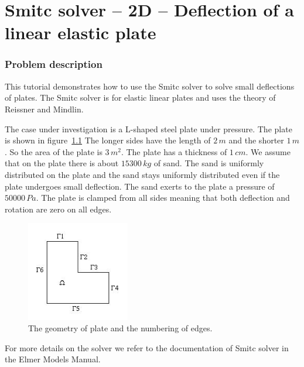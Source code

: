 \chapter{Smitc solver -- 2D -- Deflection of a linear elastic plate}



\subsection*{Problem description}

This tutorial demonstrates how to use the Smitc solver to solve small deflections of plates.
The Smitc solver is for elastic linear plates and uses the theory of Reissner and Mindlin.

The case under investigation is a L-shaped steel plate under pressure.
The plate is shown in figure~\ref{fig:simplePlate}
The longer sides have the length of $2\,m$ and the shorter $1\,m$. 
So the area of the plate is $3\,m^2$. The plate has a thickness of
$1\,cm$. We assume that on the plate
there is about $15300\,kg$ of sand. The sand is uniformly distributed
on the plate and the sand stays uniformly distributed even if the 
plate undergoes small deflection. The sand exerts to the plate
a pressure of $50000\,Pa$. The plate is clamped from all sides
meaning that both deflection and rotation are zero on all edges.
%
\begin{figure}[tbhp]
\begin{center}
\includegraphics[width=0.4\textwidth]{simplePlate}
\end{center}
\caption{The geometry of plate and the numbering of edges.}
\label{fig:simplePlate}
\end{figure}


For more details on the solver we refer to the documentation of Smitc solver in the 
Elmer Models Manual.


